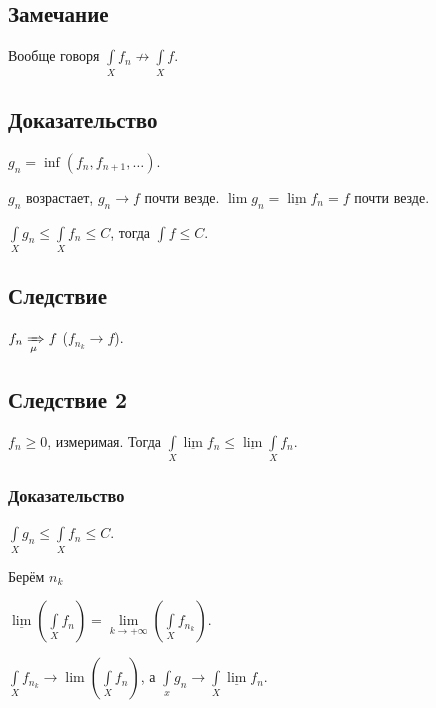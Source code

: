 \documentclass{article}
\begin{document}
        \subsection{Замечание}
            
            Вообще говоря $\int\limits_X f_n \not\rightarrow \int\limits_X f$.
                
        \subsection{Доказательство}
            
            $g_n = \inf (f_n, f_{n + 1}, \ldots)$.
                
            $g_n$ возрастает, $g_n \rightarrow f$ почти везде. $\lim g_n = \underline{\lim} f_n = f$ почти везде.
                
            $\int\limits_X g_n \leqslant \int\limits_X f_n \leqslant C$, тогда $\int f \leqslant C$.
            
        \subsection{Следствие}
            
            $f_n \xRightarrow[\mu]{} f$ ($f_{n_k} \rightarrow f$).
                
        \subsection{Следствие 2}
            
            $f_n \geqslant 0$, измеримая. Тогда $\int\limits_X \underline{\lim} f_n \leqslant \underline{\lim} \int\limits_X f_n$.
                
            \subsubsection{Доказательство}
                
                $\int\limits_X g_n \leqslant \int\limits_X f_n \leqslant C$.
                
                Берём $n_k$
                    
                $\underline{\lim} \left( \int\limits_X f_n \right) = \lim\limits_{k \rightarrow +\infty} \left( \int\limits_X f_{n_k} \right)$.
                    
                $\int\limits_X f_{n_k} \rightarrow \lim \left( \int\limits_X f_n \right)$, а $\int\limits_x g_n \rightarrow \int\limits_X \underline{\lim} f_n$.
\end{document}
